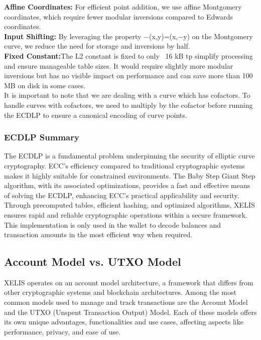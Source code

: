 \documentclass[12pt,a4paper,twocolumn]{article}
\begin{document}
\textbf{Affine Coordinates:} For efficient point addition, we use affine Montgomery coordinates, which require fewer modular inversions compared to Edwards coordinates.\\

\textbf{Input Shifting:} By leveraging the property −(x,y)=(x,−y) on the Montgomery curve, we reduce the need for storage and inversions by half.\\

\textbf{Fixed Constant:}The L2 constant is fixed to only ~16 kB tp simplify processing and ensure manageable table sizes. It would require slightly more modular inversions but has no visible impact on performance and can save more than 100 MB on disk in some cases.\\

It is important to note that we are dealing with a curve which has cofactors. To handle curves with cofactors, we need to multiply by the cofactor before running the ECDLP to ensure a canonical encoding of curve points.\\

\subsubsection{ECDLP Summary}

The ECDLP is a fundamental problem underpinning the security of elliptic curve cryptography. ECC’s efficiency compared to traditional cryptographic systems makes it highly suitable for constrained environments. The Baby Step Giant Step algorithm, with its associated optimizations, provides a fast and effective means of solving the ECDLP, enhancing ECC's practical applicability and security. Through precomputed tables, efficient hashing, and optimized algorithms, XELIS ensures rapid and reliable cryptographic operations within a secure framework.\\

This implementation is only used in the wallet to decode balances and transaction amounts in the most efficient way when required.

\subsection{Account Model vs. UTXO Model}

XELIS operates on an account model architecture, a framework that differs from other cryptographic systems and blockchain architectures. Among the most common models used to manage and track transactions are the Account Model and the UTXO (Unspent Transaction Output) Model. Each of these models offers its own unique advantages, functionalities and use cases, affecting aspects like performance, privacy, and ease of use.\\
\end{document}
